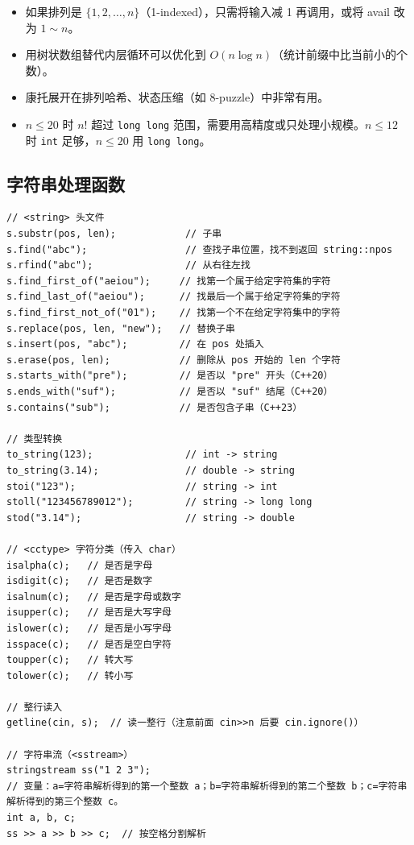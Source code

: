 \documentclass[UTF8,openany,oneside,zihao=-4]{ctexbook}
\begin{document}
\begin{tip}
\begin{itemize}
  \item 如果排列是 $\{1, 2, \ldots, n\}$（1-indexed），只需将输入减 1 再调用，或将 avail 改为 $1 \sim n$。
  \item 用树状数组替代内层循环可以优化到 $O(n \log n)$（统计前缀中比当前小的个数）。
  \item 康托展开在排列哈希、状态压缩（如 8-puzzle）中非常有用。
  \item $n \le 20$ 时 $n!$ 超过 \lstinline|long long| 范围，需要用高精度或只处理小规模。$n \le 12$ 时 \lstinline|int| 足够，$n \le 20$ 用 \lstinline|long long|。
\end{itemize}
\end{tip}

\subsection{字符串处理函数}

\begin{lstlisting}
// <string> 头文件
s.substr(pos, len);            // 子串
s.find("abc");                 // 查找子串位置，找不到返回 string::npos
s.rfind("abc");                // 从右往左找
s.find_first_of("aeiou");     // 找第一个属于给定字符集的字符
s.find_last_of("aeiou");      // 找最后一个属于给定字符集的字符
s.find_first_not_of("01");    // 找第一个不在给定字符集中的字符
s.replace(pos, len, "new");   // 替换子串
s.insert(pos, "abc");         // 在 pos 处插入
s.erase(pos, len);            // 删除从 pos 开始的 len 个字符
s.starts_with("pre");         // 是否以 "pre" 开头（C++20）
s.ends_with("suf");           // 是否以 "suf" 结尾（C++20）
s.contains("sub");            // 是否包含子串（C++23）

// 类型转换
to_string(123);                // int -> string
to_string(3.14);               // double -> string
stoi("123");                   // string -> int
stoll("123456789012");         // string -> long long
stod("3.14");                  // string -> double

// <cctype> 字符分类（传入 char）
isalpha(c);   // 是否是字母
isdigit(c);   // 是否是数字
isalnum(c);   // 是否是字母或数字
isupper(c);   // 是否是大写字母
islower(c);   // 是否是小写字母
isspace(c);   // 是否是空白字符
toupper(c);   // 转大写
tolower(c);   // 转小写

// 整行读入
getline(cin, s);  // 读一整行（注意前面 cin>>n 后要 cin.ignore()）

// 字符串流（<sstream>）
stringstream ss("1 2 3");
// 变量：a=字符串解析得到的第一个整数 a；b=字符串解析得到的第二个整数 b；c=字符串解析得到的第三个整数 c。
int a, b, c;
ss >> a >> b >> c;  // 按空格分割解析
\end{lstlisting}
\end{document}
